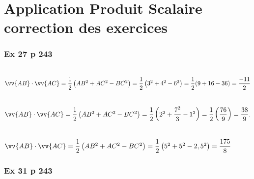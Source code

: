 \documentclass[12pt,a4paper]{book}
\begin{document}
\graphicspath{{images/}}
\setcounter{chapter}{5}
\chapter[Correction des exercices]{Application Produit Scalaire \\ correction des exercices}
\thispagestyle{fancy}


\subsection*{Ex 27 p 243}

\begin{enumMet}
    \item {}\\
$\vv{A B} \cdot \vv{A C}=\dfrac{1}{2}\left(A B^{2}+A C^{2}-B C^{2}\right)=\dfrac{1}{2}\left(3^{2}+4^{2}-6^{2}\right)=\dfrac{1}{2}(9+16-36)=\dfrac{-11}{2}$
\item {}\\
$\vv{A B} \cdot \vv{A C}=\dfrac{1}{2}\left(A B^{2}+A C^{2}-B C^{2}\right)=\dfrac{1}{2}\left(2^{2}+\dfrac{7^{2}}{3}-1^{2}\right)=\dfrac{1}{2}\left(\dfrac{76}{9}\right)=\dfrac{38}{9} .$
\item {}\\
$\vv{A B} \cdot \vv{A C}=\dfrac{1}{2}\left(A B^{2}+A C^{2}-B C^{2}\right)=\dfrac{1}{2}\left(5^{2}+5^{2}-2,5^{2}\right)=\dfrac{175}{8}$ 
\end{enumMet}

\subsection*{Ex 31 p 243}
\end{document}

